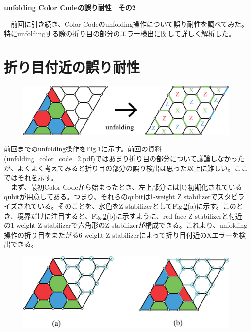 \documentclass[a4paper,10pt]{ltjsarticle}
\begin{document}
\centerline{\Large\bfseries unfolding Color Codeの誤り耐性　その2}
\vspace{10pt}
　前回に引き続き、Color Codeのunfolding操作について誤り耐性を調べてみた。特にunfoldingする際の折り目の部分のエラー検出に関して詳しく解析した。
\section{折り目付近の誤り耐性}{

    \begin{figure}[h]
        \centering
        \includegraphics[scale=0.2]{figure/figure1.eps}
        \caption{ }
        \label{figure1}
    \end{figure}

    前回までのunfolding操作をFig.\ref{figure1}に示す。前回の資料(unfolding\_color\_code\_2.pdf)ではあまり折り目の部分について議論しなかったが、よくよく考えてみると折り目の部分の誤り検出は思った以上に難しい。ここではそれを示す。\\
    　まず、最初Color Codeから始まったとき、左上部分には$\ket{0}$初期化されているqubitが用意してある。つまり、それらのqubitは1-weight Z stabilizerでスタビライズされている。そのことを、水色をZ stabilizerとしてFig.\ref{figure2}(a)に示す。このとき、境界だけに注目すると、Fig.\ref{figure2}(b)に示すように、red face Z stabilizerと付近の1-weight Z stabilizerで六角形のZ stabilizerが構成できる。これより、unfolding操作の折り目をまたがる6-weight Z stabilizerによって折り目付近のXエラーを検出できる。

    \begin{figure}[h]
        \centering
        \includegraphics[scale=0.2]{figure/figure2.eps}
        \caption{ }
        \label{figure2}
    \end{figure}

}
\end{document}
